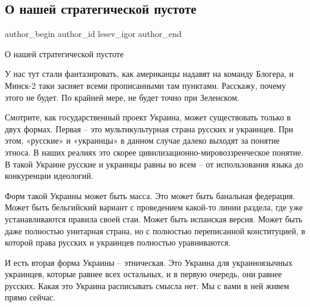  
 
 
 
 
 
\subsection{О нашей стратегической пустоте}
\label{sec:11_12_2021.fb.lesev_igor.1.strategia_pustota}
 
\ifcmt
 author_begin
   author_id lesev_igor
 author_end
\fi

О нашей стратегической пустоте

У нас тут стали фантазировать, как американцы надавят на команду Блогера, и
Минск-2 таки засияет всеми прописанными там пунктами. Расскажу, почему этого не
будет. По крайней мере, не будет точно при Зеленском.


Смотрите, как государственный проект Украина, может существовать только в двух
формах. Первая – это мультикультурная страна русских и украинцев. При этом,
«русские» и «украинцы» в данном случае далеко выходят за понятие этноса. В
наших реалиях это скорее цивилизационно-мировоззренческое понятие. В такой
Украине русские и украинцы равны во всем – от использования языка до
конкуренции идеологий.

Форм такой Украины может быть масса. Это может быть банальная федерация. Может
быть бельгийский вариант с проведением какой-то линии раздела, где уже
устанавливаются правила своей стаи. Может быть испанская версия. Может быть
даже полностью унитарная страна, но с полностью переписанной конституцией, в
которой права русских и украинцев полностью уравниваются.

И есть вторая форма Украины – этническая. Это Украина для украиноязычных
украинцев, которые равнее всех остальных, и в первую очередь, они равнее
русских. Какая это Украина расписывать смысла нет. Мы с вами в ней живем прямо
сейчас.

